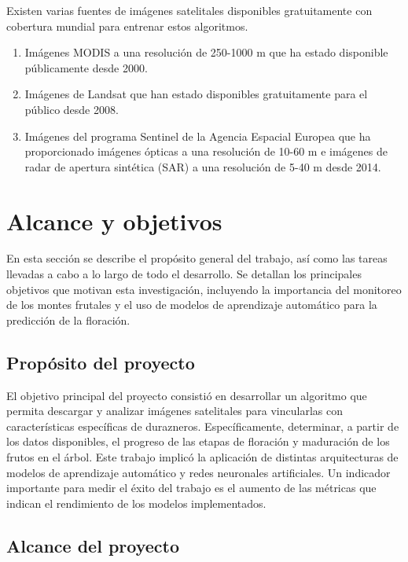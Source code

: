 Existen varias fuentes de imágenes satelitales disponibles gratuitamente con 
cobertura mundial para entrenar estos algoritmos. 

 
\begin{enumerate}
	\item Imágenes MODIS a una resolución de 250-1000 m que ha estado disponible públicamente desde 2000.
	\item Imágenes de Landsat que han estado disponibles gratuitamente para el público desde 2008.
  \item Imágenes del programa Sentinel de la Agencia Espacial Europea que ha proporcionado
  imágenes ópticas a una resolución de 10-60 m e imágenes de radar de apertura sintética (SAR) 
  a una resolución de 5-40 m desde 2014.
\end{enumerate}


\section{Alcance y objetivos}

En esta sección se describe el propósito general del trabajo, así como las tareas llevadas 
a cabo a lo largo de todo el desarrollo. Se detallan los principales objetivos que motivan 
esta investigación, incluyendo la importancia del monitoreo de los montes frutales y el uso 
de modelos de aprendizaje automático para la predicción de la floración.

\subsection{Propósito del proyecto}

El objetivo principal del proyecto consistió en desarrollar un algoritmo que permita descargar y 
analizar imágenes satelitales para vincularlas con características específicas de durazneros. 
Específicamente, determinar, a partir de los datos disponibles, el progreso de las etapas de 
floración y maduración de los frutos en el árbol. Este trabajo implicó la aplicación de distintas 
arquitecturas de modelos de aprendizaje automático y redes neuronales artificiales. Un indicador
importante para medir el éxito del trabajo es el aumento de las métricas que indican el rendimiento 
de los modelos implementados. 

\subsection{Alcance del proyecto}

